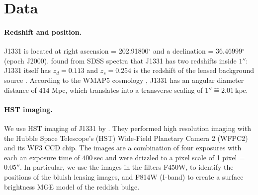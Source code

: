 \section{Data} \label{sec:data}

\paragraph{Redshift and position.} J1331 is located at right ascension = 202.91800$^\circ$ and a declination = 36.46999$^\circ$ (epoch J2000). \citet{SWELLSI} found from SDSS spectra that J1331 has two redshifts inside $1''$: J1331 itself has $z_d = 0.113$ and $z_s = 0.254$ is the redshift of the lensed background source \citep{SWELLSIII}. According to the WMAP5 cosmology \citep{WMAP5cosm}, J1331 has an angular diameter distance of 414 Mpc, which translates into a transverse scaling of $1'' \hat{=} 2.01~\text{kpc}$.

\paragraph{HST imaging.} We use HST imaging of J1331 by \citet{SWELLSI}. They performed high resolution imaging with the Hubble Space Telescope's (HST) Wide-Field Planetary Camera 2 (WFPC2) and its WF3 CCD chip. The images are a combination of four exposures with each an exposure time of $400~\text{sec}$ and were drizzled to a pixel scale of 1 pixel = $0.05''$. In particular, we use the images in the filters F450W, to identify the positions of the bluish lensing images, and F814W (I-band) to create a surface brightness MGE model of the reddish bulge.

